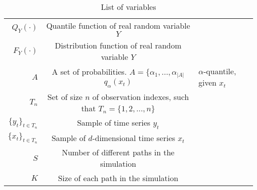 \begin{table}[htbp]\caption*{List of variables}
\begin{center}%
\begin{tabular}{r c p{10cm} }
\toprule
$Q_Y(\cdot)$ & Quantile function of real random variable $Y$ \\
$F_Y(\cdot)$ & Distribution function of real random variable $Y$ \\
$A$ & A set of probabilities. $A = \{\alpha_1, \dots, \alpha_{|A|}$
$q_\alpha(x_t)$ & $\alpha$-quantile, given $x_t$ \\
$T_n$ & Set of size $n$ of observation indexes, such that $T_n = \{1, 2, \dots, n\}$ \\
$\{y_t\}_{t \in T_n}$ & Sample of time series $y_t$  \\
$\{x_t\}_{t \in T_n}$ & Sample of $d$-dimensional time series $x_t$  \\
$S$ & Number of different paths in the simulation \\
$K$ & Size of each path in the simulation \\


\bottomrule
\end{tabular}
\end{center}
\label{tab:TableOfNotationForMyResearch}
\end{table}
